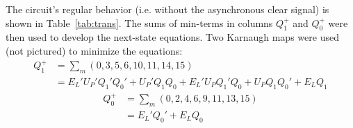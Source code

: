 \documentclass{report}
\begin{document}
The circuit's regular behavior (i.e. without the asynchronous clear signal) is shown in Table~\ref{tab:trans}.  The sums of min-terms in columns $Q_1^+$ and $Q_0^+$ were then used to develop the next-state equations.  Two Karnaugh maps were used (not pictured) to minimize the equations:
%
\begin{align}
  \label{eq:q1}
  Q_1^+ &=  \sum_m(0,3,5,6,10,11,14,15) \nonumber\\
  &= E_L'U_P'Q_1'Q_0' + U_P'Q_1Q_0 + E_L'U_PQ_1'Q_0 + U_PQ_1Q_0' + E_LQ_1
\end{align}
%
\begin{align}
  \label{eq:q0}
  Q_0^+ &= \sum_m(0,2,4,6,9,11,13,15) \nonumber \\
  &= E_L'Q_0' + E_LQ_0
\end{align}
\end{document}
